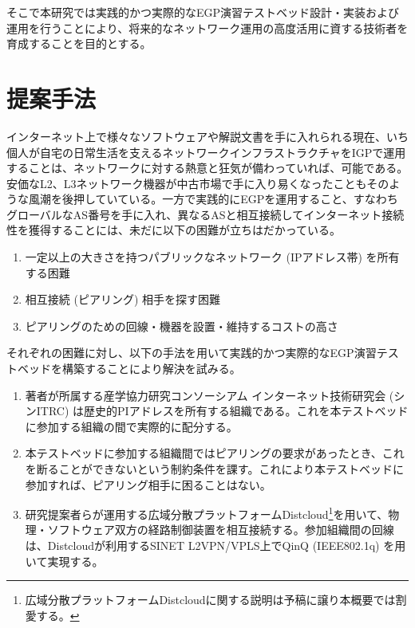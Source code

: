 \documentclass[Japanese]{dicomopapers}
\begin{document}
そこで本研究では実践的かつ実際的なEGP演習テストベッド設計・実装および運用を行うことにより、将来的なネットワーク運用の高度活用に資する技術者を育成することを目的とする。

\section{提案手法}

インターネット上で様々なソフトウェアや解説文書を手に入れられる現在、いち個人が自宅の日常生活を支えるネットワークインフラストラクチャをIGPで運用することは、ネットワークに対する熱意と狂気が備わっていれば、可能である。安価なL2、L3ネットワーク機器が中古市場で手に入り易くなったこともそのような風潮を後押していている。一方で実践的にEGPを運用すること、すなわちグローバルなAS番号を手に入れ、異なるASと相互接続してインターネット接続性を獲得することには、未だに以下の困難が立ちはだかっている。

\begin{enumerate}
 \item 一定以上の大きさを持つパブリックなネットワーク (IPアドレス帯) を所有する困難
 \item 相互接続 (ピアリング) 相手を探す困難
 \item ピアリングのための回線・機器を設置・維持するコストの高さ
\end{enumerate}

それぞれの困難に対し、以下の手法を用いて実践的かつ実際的なEGP演習テストベッドを構築することにより解決を試みる。

\begin{enumerate}
 \item 著者が所属する産学協力研究コンソーシアム インターネット技術研究会 (シンITRC) は歴史的PIアドレスを所有する組織である。これを本テストベッドに参加する組織の間で実際的に配分する。
 \item 本テストベッドに参加する組織間ではピアリングの要求があったとき、これを断ることができないという制約条件を課す。これにより本テストベッドに参加すれば、ピアリング相手に困ることはない。
 \item 研究提案者らが運用する広域分散プラットフォームDistcloud\footnote{広域分散プラットフォームDistcloudに関する説明は予稿に譲り本概要では割愛する。}を用いて、物理・ソフトウェア双方の経路制御装置を相互接続する。参加組織間の回線は、Distcloudが利用するSINET L2VPN/VPLS上でQinQ (IEEE802.1q) を用いて実現する。
\end{enumerate}
\end{document}

